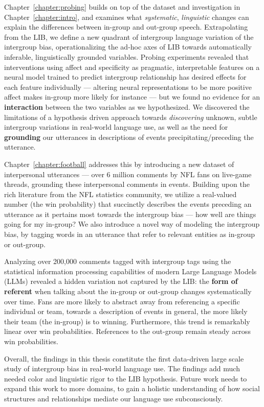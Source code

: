 Chapter~\ref{chapter:probing} builds on top of the dataset and investigation in Chapter~\ref{chapter:intro}, and examines what \emph{systematic}, \emph{linguistic} changes can explain the differences between in-group and out-group speech. Extrapolating from the LIB, we define a new quadrant of intergroup language variation of the intergroup bias, operationalizing the ad-hoc axes of LIB towards automatically inferable, linguistically grounded variables. Probing experiments revealed that interventions using affect and specificity as pragmatic, interpretable features on a neural model trained to predict intergroup relationship has desired effects for each feature individually --- altering neural representations to be more positive affect makes in-group more likely for instance --- but we found no evidence for an \textbf{interaction} between the two variables as we hypothesized. We discovered the limitations of a hypothesis driven approach towards \emph{discovering} unknown, subtle intergroup variations in real-world language use, as well as the need for \textbf{grounding} our utterances in descriptions of events precipitating/preceding the utterance.

Chapter~\ref{chapter:football} addresses this by introducing a new dataset of interpersonal utterances --- over 6 million comments by NFL fans on live-game threads, grounding these interpersonal comments in events. Building upon the rich literature from the NFL statistics community, we utilize a real-valued number (the win probability) that succinctly describes the events preceding an utterance as it pertains most towards the intergroup bias --- how well are things going for my in-group? We also introduce a novel way of modeling the intergroup bias, by tagging words in an utterance that refer to relevant entities as in-group or out-group. 

Analyzing over 200,000 comments tagged with intergroup tags using the statistical information processing capabilities of modern Large Language Models (LLMs) revealed a hidden variation not captured by the LIB: the \textbf{form of referent} when talking about the in-group or out-group changes systematically over time. Fans are more likely to abstract away from referencing a specific individual or team, towards a description of events in general, the more likely their team (the in-group) is to winning. Furthermore, this trend is remarkably linear over win probabilities. References to the out-group remain steady across win probabilities.

Overall, the findings in this thesis constitute the first data-driven large scale study of intergroup bias in real-world language use. The findings add much needed color and linguistic rigor to the LIB hypothesis. Future work needs to expand this work to more domains, to gain a holistic understanding of how social structures and relationships mediate our language use subconsciously.
